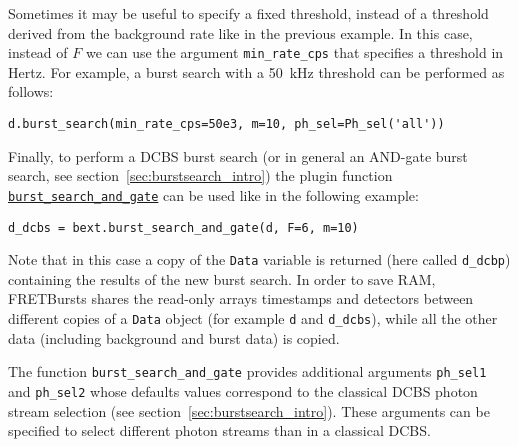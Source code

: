 Sometimes it may be useful to specify a fixed threshold, instead 
of a threshold derived from the background rate like in the previous example. In
this case, instead of $F$ we can use the argument \verb|min_rate_cps| that
specifies a threshold in Hertz. For example, a burst search with a 50~kHz
threshold can be performed as follows:

\begin{verbatim}
d.burst_search(min_rate_cps=50e3, m=10, ph_sel=Ph_sel('all'))
\end{verbatim}

Finally, to perform a DCBS burst search (or in general an AND-gate burst search,
see section~\ref{sec:burstsearch_intro}) the plugin function 
\href{http://fretbursts.readthedocs.org/en/latest/plugins.html#fretbursts.burstlib\_ext.burst\_search\_and\_gate}{\texttt{burst\_search\_and\_gate}}
can be used like in the following example:

\begin{verbatim}
d_dcbs = bext.burst_search_and_gate(d, F=6, m=10)
\end{verbatim}

Note that in this case a copy of the \verb|Data| variable is returned (here called \verb|d_dcbp|)
containing the results of the new burst search. In order to
save RAM, FRETBursts shares the read-only arrays timestamps and detectors between
different copies of a \verb|Data| object (for example \verb|d| and
\verb|d_dcbs|), while all the other data (including background and burst data)
is copied. 

The function \verb|burst_search_and_gate| provides additional arguments
\verb|ph_sel1| and \verb|ph_sel2| whose defaults values correspond to the 
classical DCBS photon stream selection (see section~\ref{sec:burstsearch_intro}).
These arguments can be specified to select different photon streams than in 
a classical DCBS.
